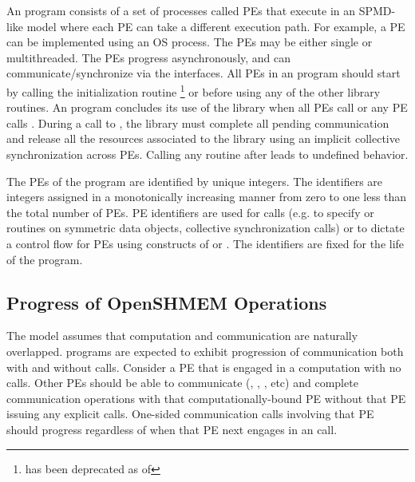 An \openshmem program consists of a set of \openshmem processes called \acp{PE}
that execute in an \ac{SPMD}-like model where each \ac{PE} can take a different
execution path. For example, a \ac{PE} can be implemented using an OS
process. The \acp{PE} may be either single or multithreaded.
The \acp{PE} progress asynchronously, and can communicate/synchronize
via the \openshmem interfaces.  All \acp{PE} in an \openshmem program should
start by calling the initialization routine %
\footnote{ has been deprecated as of \openshmem[1.2]}
or  before using any of the other \openshmem library routines. 
An \openshmem program concludes its use of the \openshmem library when all \acp{PE} call
 or any \ac{PE} calls .
During a call to , the \openshmem library must
complete all pending communication and release all the resources associated to
the library using an implicit collective synchronization across \acp{PE}.
Calling any \openshmem routine after  leads to undefined
behavior.

The \acp{PE} of the \openshmem program are identified by unique integers.  The
identifiers are integers assigned in a monotonically increasing manner from zero
to one less than the total number of \acp{PE}. \ac{PE} identifiers are used for
\openshmem calls (e.g. to specify  or  routines on symmetric
data objects, collective synchronization calls) or to dictate a control flow for
\acp{PE} using constructs of \Cstd or \Fortran. The identifiers are fixed for
the life of the \openshmem program.

\subsection{Progress of OpenSHMEM Operations}\label{subsec:progress}

The \openshmem model assumes that computation and communication are naturally
overlapped. \openshmem programs are expected to exhibit progression of
communication both with and without \openshmem calls. Consider a \ac{PE} that is
engaged in a computation with no \openshmem calls. Other \acp{PE} should be able
to communicate (, , , etc) and
complete communication operations with that computationally-bound \ac{PE}
without that \ac{PE} issuing any explicit \openshmem calls. One-sided \openshmem
communication calls involving that \ac{PE} should progress regardless of when
that \ac{PE} next engages in an \openshmem call.

